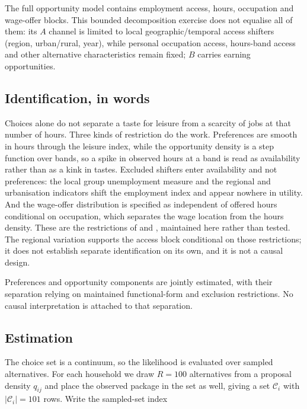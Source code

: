 \documentclass[11pt,a4paper]{article}
\begin{document}
The full opportunity model contains employment access, hours, occupation and wage-offer blocks. This bounded decomposition exercise does not equalise all of them: its \(A\) channel is limited to local geographic/temporal access shifters (region, urban/rural, year), while personal occupation access, hours-band access and other alternative characteristics remain fixed; \(B\) carries earning opportunities.

\subsection{Identification, in words}\label{identification-in-words}

Choices alone do not separate a taste for leisure from a scarcity of jobs at that number of hours. Three kinds of restriction do the work. Preferences are smooth in hours through the leisure index, while the opportunity density is a step function over bands, so a spike in observed hours at a band is read as availability rather than as a kink in tastes. Excluded shifters enter availability and not preferences: the local group unemployment measure and the regional and urbanisation indicators shift the employment index and appear nowhere in utility. And the wage-offer distribution is specified as independent of offered hours conditional on occupation, which separates the wage location from the hours density. These are the restrictions of \citet{capeau2016} and \citet{dagsvikjia2016}, maintained here rather than tested. The regional variation supports the access block conditional on those restrictions; it does not establish separate identification on its own, and it is not a causal design.

Preferences and opportunity components are jointly estimated, with their separation relying on maintained functional-form and exclusion restrictions. No causal interpretation is attached to that separation.

\subsection{Estimation}\label{estimation}

The choice set is a continuum, so the likelihood is evaluated over sampled alternatives. For each household we draw \(R=100\) alternatives from a proposal density \(q_{ij}\) and place the observed package in the set as well, giving a set \(\mathcal C_i\) with \(|\mathcal C_i|=101\) rows. Write the sampled-set index
\end{document}
